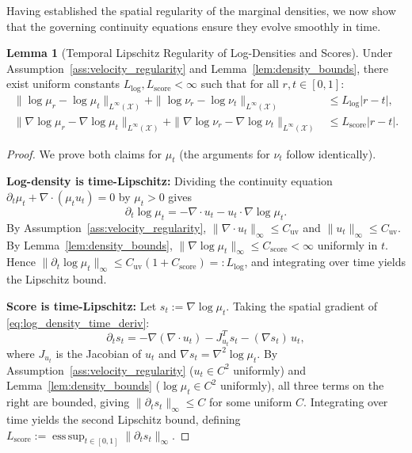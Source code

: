 \documentclass[11pt]{article}
\theoremstyle{definition}
\newtheorem{lemma}[theorem]{Lemma}
\numberwithin{equation}{section}%
\begin{document}
{Having established the spatial regularity of the marginal densities, we now show that the governing continuity equations ensure they evolve smoothly in time.


\begin{lemma}[Temporal Lipschitz Regularity of Log-Densities and Scores]
\label{lem:temporal_marginal_regularity}
\label{lem:score_time_lip}
Under Assumption~\ref{ass:velocity_regularity} and Lemma~\ref{lem:density_bounds}, there exist uniform constants $L_{\log}, L_{\mathrm{score}} < \infty$ such that for all $r, t \in [0,1]$:
\begin{align*}
\|\log \mu_r - \log \mu_t\|_{L^\infty(\mathcal{X})} + \|\log \nu_r - \log \nu_t\|_{L^\infty(\mathcal{X})} &\le L_{\log} |r - t|,\\
\|\nabla \log \mu_r - \nabla \log \mu_t\|_{L^\infty(\mathcal{X})} + \|\nabla \log \nu_r - \nabla \log \nu_t\|_{L^\infty(\mathcal{X})} &\le L_{\mathrm{score}} |r - t|.
\end{align*}
\end{lemma}

\begin{proof}
We prove both claims for $\mu_t$ (the arguments for $\nu_t$ follow identically).

\noindent\textbf{Log-density is time-Lipschitz:}
Dividing the continuity equation $\partial_t\mu_t + \nabla\cdot(\mu_t u_t)=0$ by $\mu_t > 0$ gives
\begin{equation}
\label{eq:log_density_time_deriv}
\partial_t \log \mu_t = -\nabla \cdot u_t - u_t \cdot \nabla \log \mu_t.
\end{equation}
By Assumption~\ref{ass:velocity_regularity}, $\|\nabla\cdot u_t\|_\infty \le C_{\mathrm{uv}}$ and $\|u_t\|_\infty \le C_{\mathrm{uv}}$.
By Lemma~\ref{lem:density_bounds}, $\|\nabla\log\mu_t\|_\infty \le C_{\mathrm{score}} < \infty$ uniformly in $t$.
Hence $\|\partial_t\log\mu_t\|_\infty \le C_{\mathrm{uv}}(1 + C_{\mathrm{score}}) =: L_{\log}$,
and integrating over time yields the Lipschitz bound.

\noindent\textbf{Score is time-Lipschitz:}
Let $s_t := \nabla\log\mu_t$. Taking the spatial gradient of \eqref{eq:log_density_time_deriv}:
\begin{equation}
\label{eq:score_pde}
\partial_t s_t = -\nabla(\nabla\cdot u_t) - J_{u_t}^T s_t - (\nabla s_t)\,u_t,
\end{equation}
where $J_{u_t}$ is the Jacobian of $u_t$ and $\nabla s_t = \nabla^2\log\mu_t$.
By Assumption~\ref{ass:velocity_regularity} ($u_t \in C^2$ uniformly) and Lemma~\ref{lem:density_bounds} ($\log\mu_t \in C^2$ uniformly), all three terms on the right are bounded, giving $\|\partial_t s_t\|_\infty \le C$ for some uniform $C$. Integrating over time yields the second Lipschitz bound, defining $L_{\mathrm{score}} := \operatorname{ess\,sup}_{t\in[0,1]}\|\partial_t s_t\|_\infty$.
\end{proof}

}
\end{document}

